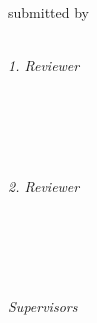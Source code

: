 \begin{titlepage}
	\tgherosfont
	\centering

	{\Large \thesisUniversity} \\[4mm]
	\textsf{\thesisUniversityDepartment} \\
	\textsf{\thesisUniversityInstitute} \\

	\vfill
	{\large \thesisSubject} \\[5mm]
	{\LARGE \color{ctcolortitle}\textbf{\thesisTitle} \\[10mm]}
	{\large submitted by} \\[5mm]
	{\Large \thesisName} \\

	\vfill
	\begin{minipage}[t]{.27\textwidth}
		\raggedleft
		\textit{1. Reviewer}
	\end{minipage}
	\hspace*{25pt}
	\begin{minipage}[t]{.40\textwidth}
		{\Large \thesisFirstReviewer} \\
	  	{\small \thesisFirstReviewerUniversity} \\[-1mm]
		{\small \thesisFirstReviewerCity}
	\end{minipage} \\[5mm]
	\begin{minipage}[t]{.27\textwidth}
		\raggedleft
		\textit{2. Reviewer}
	\end{minipage}
	\hspace*{25pt}
	\begin{minipage}[t]{.40\textwidth}
		{\Large \thesisSecondReviewer} \\
	  	{\small \thesisSecondReviewerUniversity} \\[-1mm]
		{\small \thesisSecondReviewerCity}
	\end{minipage} \\[10mm]
	\begin{minipage}[t]{.27\textwidth}
		\raggedleft
		\textit{Supervisors}
	\end{minipage}
	\hspace*{25pt}
	\begin{minipage}[t]{.40\textwidth}
		\thesisFirstSupervisor\ \\ \thesisSecondSupervisor\ \\ \thesisThirdSupervisor
	\end{minipage} \\[10mm]

	\thesisDate \\

\end{titlepage}


